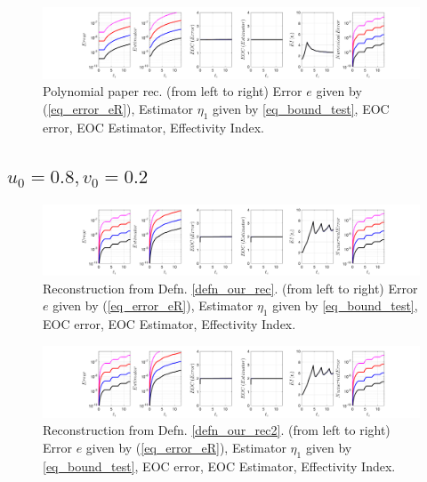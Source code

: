 \documentclass[12pt,a4paper]{article}
\numberwithin{equation}{section}
\theoremstyle{definition}
\begin{document}
\begin{figure}[H]
	\hspace{-3cm}
	\includegraphics[scale=0.55]{fig_LeapFrogplots_1x5_sin_IC_harmonic_u7_v3_paperrec_poly}	
	\caption{Polynomial paper rec. (from left to right) Error $e$ given by (\ref{eq_error_eR}), Estimator $\eta_1$ given by \ref{eq_bound_test},   EOC error, EOC Estimator, Effectivity Index.}
	\label{fig_all_in_one_paperrec_poly_u07_v03}
\end{figure}

\subsection*{$u_0=0.8, v_0= 0.2$}
\begin{figure}[H]
	\hspace{-3cm}
	\includegraphics[scale=0.55]{fig_LeapFrogplots_1x5_sin_IC_harmonic_order_2_u8_v2_rec_george}	
	\caption{Reconstruction from Defn. \ref{defn_our_rec}. (from left to right) Error $e$ given by (\ref{eq_error_eR}), Estimator $\eta_1$ given by \ref{eq_bound_test},   EOC error, EOC Estimator, Effectivity Index.}
	\label{fig_all_in_one_our_rec_george_u8_v2}
\end{figure}
\begin{figure}[H]
	\hspace{-3cm}
	\includegraphics[scale=0.55]{fig_LeapFrogplots_1x5_sin_IC_harmonic_order_2_u8_v2_rec2}	
	\caption{Reconstruction from Defn. \ref{defn_our_rec2}. (from left to right) Error $e$ given by (\ref{eq_error_eR}), Estimator $\eta_1$ given by \ref{eq_bound_test},   EOC error, EOC Estimator, Effectivity Index.}
	\label{fig_all_in_one_our_rec_2_u8_v2}
\end{figure}
\end{document}
